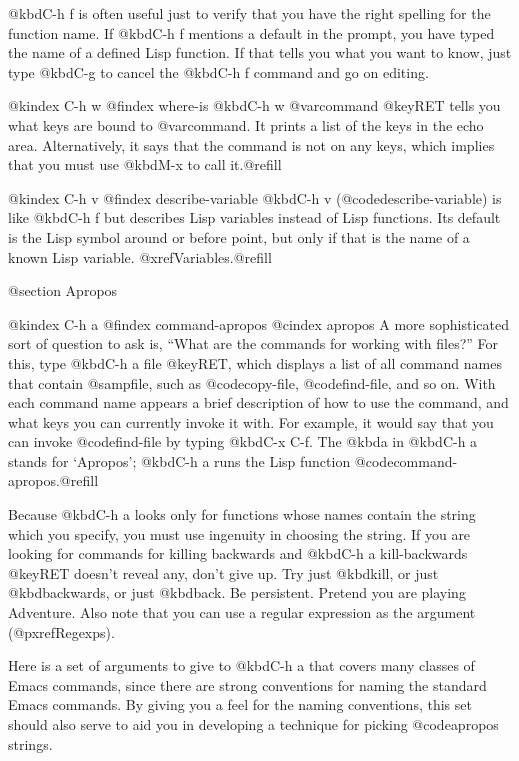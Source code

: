 {{{{{{  @kbd{C-h f} is often useful just to verify that you have the right
spelling for the function name.  If @kbd{C-h f} mentions a default in the
prompt, you have typed the name of a defined Lisp function.  If that tells
you what you want to know, just type @kbd{C-g} to cancel the @kbd{C-h f}
command and go on editing.

@kindex C-h w
@findex where-is
  @kbd{C-h w @var{command} @key{RET}} tells you what keys are bound to
@var{command}.  It prints a list of the keys in the echo area.
Alternatively, it says that the command is not on any keys, which implies
that you must use @kbd{M-x} to call it.@refill

@kindex C-h v
@findex describe-variable
  @kbd{C-h v} (@code{describe-variable}) is like @kbd{C-h f} but describes
Lisp variables instead of Lisp functions.  Its default is the Lisp symbol
around or before point, but only if that is the name of a known Lisp
variable.  @xref{Variables}.@refill

@section Apropos

@kindex C-h a
@findex command-apropos
@cindex apropos
  A more sophisticated sort of question to ask is, ``What are the commands
for working with files?''  For this, type @kbd{C-h a file @key{RET}}, which
displays a list of all command names that contain @samp{file}, such as
@code{copy-file}, @code{find-file}, and so on.  With each command name
appears a brief description of how to use the command, and what keys you
can currently invoke it with.  For example, it would say that you can
invoke @code{find-file} by typing @kbd{C-x C-f}.  The @kbd{a} in @kbd{C-h
a} stands for `Apropos'; @kbd{C-h a} runs the Lisp function
@code{command-apropos}.@refill

  Because @kbd{C-h a} looks only for functions whose names contain the
string which you specify, you must use ingenuity in choosing the string.
If you are looking for commands for killing backwards and @kbd{C-h a
kill-backwards @key{RET}} doesn't reveal any, don't give up.  Try just
@kbd{kill}, or just @kbd{backwards}, or just @kbd{back}.  Be persistent.
Pretend you are playing Adventure.  Also note that you can use a
regular expression as the argument (@pxref{Regexps}).

  Here is a set of arguments to give to @kbd{C-h a} that covers many
classes of Emacs commands, since there are strong conventions for naming
the standard Emacs commands.  By giving you a feel for the naming
conventions, this set should also serve to aid you in developing a
technique for picking @code{apropos} strings.

}}}}}}
